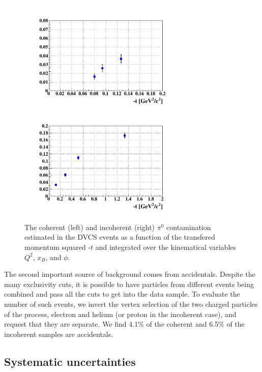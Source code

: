 \documentclass[aps,prc,preprint,superscriptaddress]{revtex4}
\begin{document}
\begin{figure}[tbp]
\includegraphics[width=8cm]{fig3/T_ratio_pi0_dvcs_Coh_t.pdf}
\includegraphics[width=8cm]{fig3/T_ratio_pi0_dvcs_InCoh_t.pdf}
\caption{The coherent (left) and incoherent (right) $\pi^{0}$ 
contamination estimated in the DVCS events as a function of the 
transfered momentum squared -$t$ and integrated over the kinematical 
variables $Q^2$, $x_B$, and $\phi$.}
\label{fig:cont_yield}
\end{figure}

The second important source of background comes from accidentals. Despite the many exclusivity cuts, it is 
possible to have particles from different events being combined and pass all the cuts to get 
into the data sample. To evaluate the number of such events, we invert the vertex selection 
of the two charged 
particles of the process, electron and helium (or proton in the incoherent case), and request that they
are separate. We find 4.1\% of the coherent and 6.5\% of the incoherent samples are accidentals. 

\subsection{Systematic uncertainties}
\end{document}
